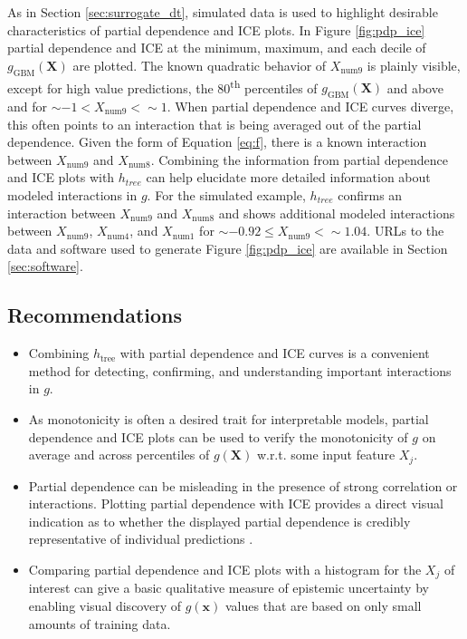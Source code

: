 \documentclass[sigconf, review]{acmart}
\begin{document}
As in Section \ref{sec:surrogate_dt}, simulated data is used to highlight desirable characteristics of partial dependence and ICE plots. In Figure \ref{fig:pdp_ice} partial dependence and ICE at the minimum, maximum, and each decile of $g_{\text{GBM}}(\mathbf{X})$ are plotted. The known quadratic behavior of $X_{\text{num}9}$ is plainly visible, except for high value predictions, the 80\textsuperscript{th} percentiles of $g_{\text{GBM}}(\mathbf{X})$ and above and for $\sim-1 < X_{\text{num}9} < \sim1$. When partial dependence and ICE curves diverge, this often points to an interaction that is being averaged out of the partial dependence. Given the form of Equation \ref{eq:f}, there is a known interaction between $X_{\text{num}9}$ and $X_{\text{num}8}$. Combining the information from partial dependence and ICE plots with $h_{tree}$ can help elucidate more detailed information about modeled interactions in $g$. For the simulated example, $h_{tree}$ confirms an interaction between $X_{\text{num}9}$ and $X_{\text{num}8}$ and shows additional modeled interactions between $X_{\text{num}9}$, $X_{\text{num}4}$, and $X_{\text{num}1}$ for $\sim -0.92 \le X_{\text{num}9} <  \sim 1.04.$ URLs to the data and software used to generate Figure \ref{fig:pdp_ice} are available in Section \ref{sec:software}.

\subsection{Recommendations}

\begin{itemize}

\item Combining $h_{\text{tree}}$ with partial dependence and ICE curves is a convenient method for detecting, confirming, and understanding important interactions in $g$.

\item As monotonicity is often a desired trait for interpretable models, partial dependence and ICE plots can be used to verify the monotonicity of $g$ on average and across percentiles of $g(\mathbf{X})$ w.r.t. some input feature $X_j$.

\item Partial dependence can be misleading in the presence of strong correlation or interactions. Plotting partial dependence with ICE provides a direct visual indication as to whether the displayed partial dependence is credibly representative of individual predictions \cite{ice_plots}.

\item Comparing partial dependence and ICE plots with a histogram for the $X_j$ of interest can give a basic qualitative measure of epistemic uncertainty by enabling visual discovery of $g(\mathbf{x})$ values that are based on only small amounts of training data.

\end{itemize}
\end{document}
